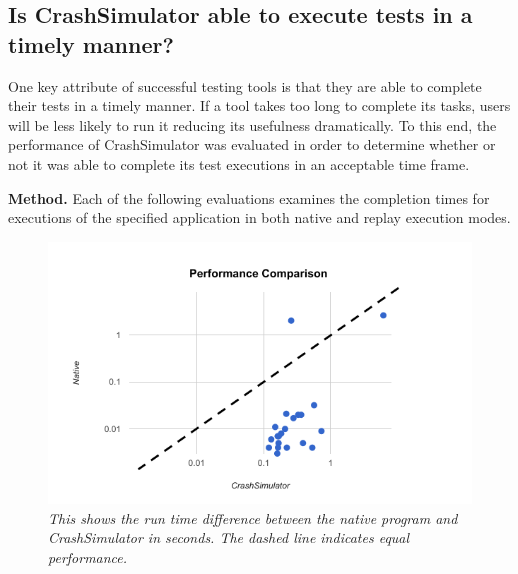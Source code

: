 
\subsection{Is CrashSimulator able to execute tests in a timely  manner?}
\label{sec-perf}


One key attribute of successful testing tools is that they are able to
complete their tests in a timely manner.  If a tool takes too long to
complete its tasks, users will be less likely to run it
reducing its usefulness dramatically. To this end, the
performance of CrashSimulator was evaluated in order to determine whether
or not it was able to complete its test executions in an acceptable time
frame.  

{\bf Method.} Each of the following evaluations examines the completion
times for executions of the specified application in both
native and replay execution modes.


    \begin{figure}[t]
        \center{}
        \includegraphics[scale=.5]{performance.png}
        \caption{\emph{This shows the run time difference between the
native program and CrashSimulator in seconds. The dashed line indicates equal
performance. }}
         \label{figure:performance}

    \end{figure}


